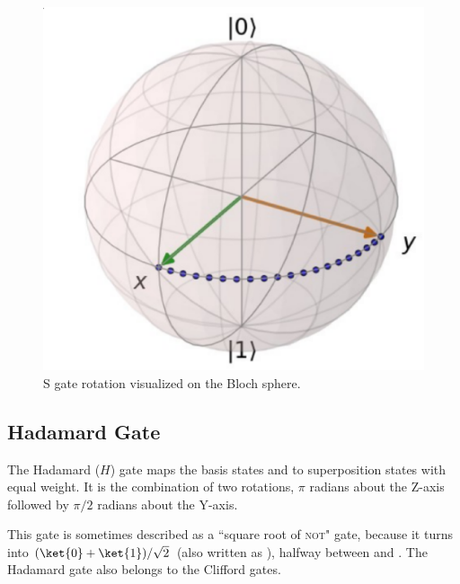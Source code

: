 \documentclass[11pt, notitlepage]{report}
\begin{document}
\begin{figure}[ht]
  \centering
  \includegraphics[scale=0.22]{images/s_gate.eps}
  \caption{S gate rotation visualized on the Bloch sphere.}
  \label{fig:s_bloch}
\end{figure}

\subsection{Hadamard Gate}
The Hadamard ($H$) gate maps the basis states  and  to superposition states with equal weight. It is the combination of two rotations, $\pi$ radians about the Z-axis followed by $\pi/2$ radians about the Y-axis.

This gate is sometimes described as a ``square root of \textsc{not}" gate, because it turns  into $(\ket{0} + \ket{1})/\sqrt2$ (also written as \ket{+}), halfway between  and . The Hadamard gate also belongs to the Clifford gates.
\end{document}
